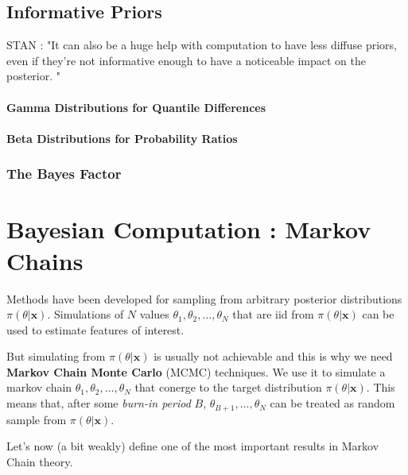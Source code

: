\subsection{Informative Priors}

STAN : "It can
also be a huge help with computation to have less diffuse priors, even
if they're not informative enough to have a noticeable impact on the posterior. "

\paragraph*{Gamma Distributions for Quantile Differences}


\paragraph*{Beta Distributions for Probability Ratios}



\subsubsection*{The Bayes Factor}




\section{Bayesian Computation : Markov Chains}


Methods have been developed for sampling from arbitrary posterior distributions $\pi(\theta|\boldsymbol{x})$. Simulations of $N$ values $\theta_1,\theta_2,\dots,\theta_N$ that are iid from $\pi(\theta|\boldsymbol{x})$ can be used to estimate features of interest.

But simulating from $\pi(\theta|\boldsymbol{x})$ is usually not achievable and this is why we need \textbf{Markov Chain Monte Carlo} (MCMC) techniques. 
We use it to simulate a markov chain $\theta_1,\theta_2,\dots,\theta_N$ that conerge to the target distribution $\pi(\theta|\boldsymbol{x})$.
This means that, after some \emph{burn-in period} $B$, $\theta_{B+1},\dots,\theta_N$ can be treated as random sample from $\pi(\theta|\boldsymbol{x})$.


Let's now (a bit weakly) define one of the most important results in Markov Chain theory.

